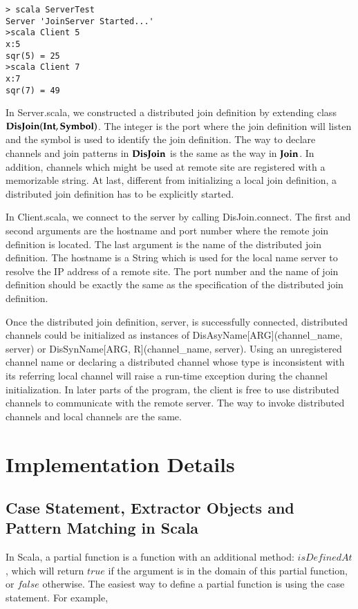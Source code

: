 \begin{lstlisting}
> scala ServerTest                                    
Server 'JoinServer Started...'
>scala Client 5
x:5
sqr(5) = 25
>scala Client 7
x:7
sqr(7) = 49
\end{lstlisting}


In Server.scala, we constructed a distributed join definition by extending class $\bf{DisJoin(Int, Symbol)}$.  The integer is the port where the join definition will listen and the symbol is used to identify the join definition.  The way to declare channels and join patterns in $\bf{DisJoin}$ is the same as the way in $\bf{Join}$.  In addition,  channels which might be used at remote site are registered with a memorizable string.  At last, different from initializing a local join definition, a distributed join definition has to be explicitly started.

In Client.scala, we connect to the server by calling DisJoin.connect.  The first and second arguments are the hostname and port number where the remote join definition is located.  The last argument is the name of the distributed join definition.  The hostname is a String which is used for the local name server to resolve the IP address of a remote site.  The port number and the name of join definition should be exactly the same as the specification of the distributed join definition.

Once the distributed join definition, server, is successfully connected, distributed channels could be initialized as instances of DisAsyName[ARG](channel\_name, server) or DisSynName[ARG, R](channel\_name, server).  Using an unregistered channel name or declaring a distributed channel whose type is inconsistent with  its referring local channel will raise a run-time exception during the channel initialization.  In later parts of the program, the client is free to use distributed channels to communicate with the remote server.  The way to invoke distributed channels and local channels are the same.

\section{Implementation Details}
\subsection{Case Statement, Extractor Objects and Pattern Matching in Scala}

In Scala, a partial function is a function with an additional method: $isDefinedAt$, which will return $true$ if the argument is in the domain of this partial function, or $false$ otherwise.  The easiest way to define a partial function is using the case statement.  For example,

